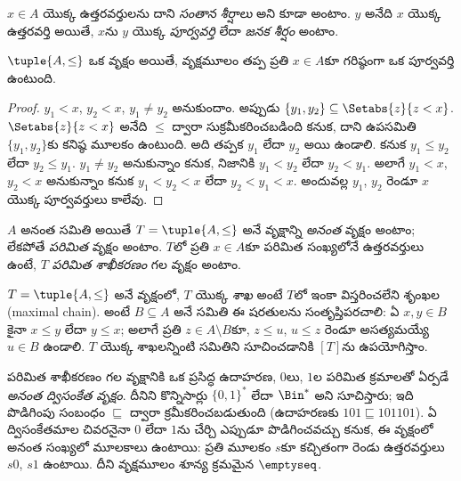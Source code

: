 \documentclass[../../../include/open-logic-section]{subfiles}
\begin{document}
$x \in A$ యొక్క ఉత్తరవర్తులను దాని \emph{సంతాన శీర్షాలు} అని కూడా అంటాం.
$y$ అనేది $x$ యొక్క ఉత్తరవర్తి అయితే, $x$ను $y$ యొక్క
\emph{పూర్వవర్తి} లేదా \emph{జనక శీర్షం} అంటాం.

\begin{prop}
$\tuple{A,\le}$ ఒక వృక్షం అయితే, వృక్షమూలం తప్ప ప్రతి
$x \in A$కూ గరిష్ఠంగా ఒక పూర్వవర్తి ఉంటుంది.
\end{prop}

\begin{proof}
  $y_1 < x$, $y_2 < x$, $y_1 \neq y_2$ అనుకుందాం.
  అప్పుడు $\{y_1, y_2\} \subseteq \Setabs{z}{z<x}$.
  $\Setabs{z}{z<x}$ అనేది $\le$ ద్వారా సుక్రమీకరించబడింది కనుక,
  దాని ఉపసమితి $\{y_1, y_2\}$కు కనిష్ఠ మూలకం ఉంటుంది.
  అది తప్పక $y_1$ లేదా $y_2$ అయి ఉండాలి.
  కనుక $y_1 \le y_2$ లేదా $y_2 \le y_1$.
  $y_1 \neq y_2$ అనుకున్నాం కనుక, నిజానికి $y_1 < y_2$
  లేదా $y_2 < y_1$. అలాగే $y_1 < x$, $y_2 < x$ అనుకున్నాం కనుక
  $y_1 < y_2 < x$ లేదా $y_2 < y_1 < x$.
  అందువల్ల $y_1$, $y_2$ రెండూ $x$ యొక్క పూర్వవర్తులు కాలేవు.
\end{proof}

\begin{defn}
$A$ అనంత సమితి అయితే $T = \tuple{A, \le}$ అనే వృక్షాన్ని
\emph{అనంత} వృక్షం అంటాం; లేకపోతే \emph{పరిమిత} వృక్షం అంటాం.
$T$లో ప్రతి $x \in A$కూ పరిమిత సంఖ్యలోనే ఉత్తరవర్తులు ఉంటే,
$T$ \emph{పరిమిత శాఖీకరణం} గల వృక్షం అంటాం.
\end{defn}

\begin{defn}[శాఖలు]
$T = \tuple{A, \le}$ అనే వృక్షంలో, $T$ యొక్క \emph{శాఖ}
అంటే $T$లో ఇంకా విస్తరించలేని శృంఖల (maximal chain).
అంటే $B \subseteq A$ అనే సమితి ఈ షరతులను సంతృప్తిపరచాలి:
ఏ $x, y \in B$కైనా $x \le y$ లేదా $y \le x$;
అలాగే ప్రతి $z \in A \setminus B$కూ,
$z \le u$, $u \le z$ రెండూ అసత్యమయ్యే $u \in B$ ఉండాలి.
%
$T$ యొక్క శాఖలన్నింటి సమితిని సూచించడానికి $[T]$ను ఉపయోగిస్తాం.
\end{defn}

\begin{ex}
పరిమిత శాఖీకరణం గల వృక్షానికి ఒక ప్రసిద్ధ ఉదాహరణ,
$0$లు, $1$ల పరిమిత క్రమాలతో ఏర్పడే \emph{అనంత ద్విసంకేత వృక్షం}.
దీనిని కొన్నిసార్లు $\{0,1\}^*$ లేదా $\Bin^*$ అని సూచిస్తారు;
ఇది పొడిగింపు సంబంధం $\sqsubseteq$ ద్వారా క్రమీకరించబడుతుంది
(ఉదాహరణకు $101 \sqsubseteq 101101$).
ఏ ద్విసంకేతమాల చివరనైనా $0$ లేదా $1$ను చేర్చి ఎప్పుడూ
పొడిగించవచ్చు కనుక, ఈ వృక్షంలో అనంత సంఖ్యలో మూలకాలు ఉంటాయి:
ప్రతి మూలకం $s$కూ కచ్చితంగా రెండు ఉత్తరవర్తులు $s0$, $s1$ ఉంటాయి.
దీని వృక్షమూలం శూన్య క్రమమైన $\emptyseq$.
\end{ex}
\end{document}
